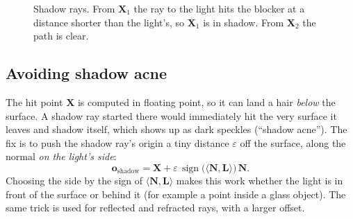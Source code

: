 \documentclass[11pt,a4paper]{article}
\newcommand{\vv}[1]{\mathbf{#1}}
\newcommand{\dotp}[2]{\langle #1, #2\rangle}
\begin{document}
\begin{figure}[h]
\centering
{}
\caption{Shadow rays. From $\vv X_1$ the ray to the light hits the blocker at a
distance shorter than the light's, so $\vv X_1$ is in shadow. From $\vv X_2$ the
path is clear.}
\end{figure}

\subsection{Avoiding shadow acne}

The hit point $\vv X$ is computed in floating point, so it can land a hair
\emph{below} the surface. A shadow ray started there would immediately hit the
very surface it leaves and shadow itself, which shows up as dark speckles
(``shadow acne''). The fix is to push the shadow ray's origin a tiny distance
$\varepsilon$ off the surface, along the normal \emph{on the light's side}:
\[
  \vv o_{\text{shadow}} = \vv X + \varepsilon\,\operatorname{sign}\!\big(\dotp{\vv N}{\vv L}\big)\,\vv N .
\]
Choosing the side by the sign of $\dotp{\vv N}{\vv L}$ makes this work whether
the light is in front of the surface or behind it (for example a point inside a
glass object). The same trick is used for reflected and refracted rays, with a
larger offset.
\end{document}
